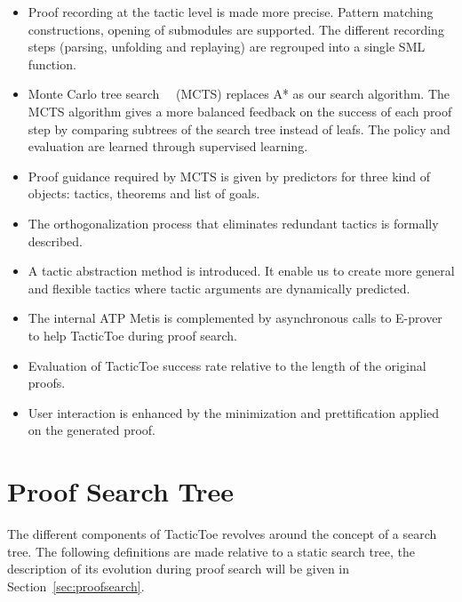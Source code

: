 \documentclass[runningheads,a4paper,draft]{svjour3}
\newcommand{\todoi}[1]{\todo[inline]{#1}}
\def\eprover{\textsf{E-prover}\xspace}
\def\sml{\textsf{SML}\xspace}
\def\metis{\textsf{Metis}\xspace}
\def\tactictoe{\textsf{TacticToe}\xspace}
\begin{document}
\begin{itemize}
\item Proof recording at the tactic level is made more precise. Pattern 
matching constructions, opening of submodules are supported. The different 
recording steps (parsing, unfolding and replaying) are regrouped into a single 
\sml function.
\item Monte Carlo tree search~~\cite{montecarlo} (MCTS) replaces A* as our 
search algorithm. The MCTS algorithm gives a more balanced feedback on 
the success of 
each proof step by
comparing subtrees of the search tree instead of leafs. The policy and 
evaluation are learned 
through supervised learning.
\item Proof guidance required by MCTS is given by predictors for 
three kind of objects: tactics, theorems and list of goals.
\item The orthogonalization process that eliminates redundant tactics is 
formally described.
\item A tactic abstraction method is introduced. It enable us to create 
more general and flexible tactics where tactic arguments are dynamically 
predicted.
\item The internal ATP \metis is complemented 
by asynchronous calls to \eprover to help \tactictoe during proof search.
\todoi{More on evaluation??}
\item Evaluation of \tactictoe success rate relative to 
the length of the original proofs.
\item User interaction is enhanced by the minimization and prettification 
applied on the generated proof.
\end{itemize}


\section{Proof Search Tree}\label{sec:prelim}
  
The different components of \tactictoe revolves around the concept of a 
search tree. The following definitions are made relative to a static search 
tree, the description of its evolution during proof search will be given in 
Section~\ref{sec:proofsearch}.
\end{document}
